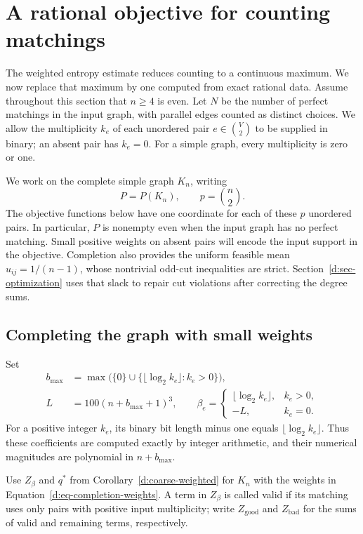 \section{A rational objective for counting matchings}
\label{d:sec-objective}

The weighted entropy estimate reduces counting to a continuous maximum.
We now replace that maximum by one computed from exact rational data.
Assume throughout this section that \(n\ge4\) is even.  Let \(N\) be the
number of perfect matchings in the input graph, with parallel edges
counted as distinct choices.  We allow the multiplicity \(k_e\) of each
unordered pair \(e\in\binom V2\) to be supplied in binary; an absent pair
has \(k_e=0\).  For a simple graph, every multiplicity is zero or one.

We work on the complete simple graph \(K_n\), writing
\[
  P=P(K_n),\qquad p=\binom n2.
\]
The objective functions below have one coordinate for each of these
\(p\) unordered pairs.  In particular, \(P\) is nonempty even when
the input graph has no perfect matching. Small positive weights on absent
pairs will encode the input support in the objective. Completion also
provides the uniform feasible mean \(u_{ij}=1/(n-1)\), whose nontrivial
odd-cut inequalities are strict. Section~\ref{d:sec-optimization} uses
that slack to repair cut violations after correcting the degree sums.

\subsection{Completing the graph with small weights}

Set
\begin{equation}
\label{d:eq-completion-weights}
\begin{split}
 b_{\max}&=\max\bigl(\{0\}\cup
       \{\lfloor\log_2 k_e\rfloor:k_e>0\}\bigr),\\
 L&=100(n+b_{\max}+1)^3,\qquad
 \beta_e=
 \begin{cases}
   \lfloor\log_2 k_e\rfloor,&k_e>0,\\
   -L,&k_e=0.
 \end{cases}
\end{split}
\end{equation}
For a positive integer \(k_e\), its binary bit length minus one equals
\(\lfloor\log_2 k_e\rfloor\).  Thus these coefficients are computed
exactly by integer arithmetic, and their numerical magnitudes are
polynomial in \(n+b_{\max}\).

Use \(Z_\beta\) and \(q^*\) from Corollary~\ref{d:coarse-weighted} for \(K_n\)
with the weights in Equation~\eqref{d:eq-completion-weights}.  A term in
\(Z_\beta\) is called valid if its matching uses only pairs with positive
input multiplicity; write \(Z_{\mathrm{good}}\) and
\(Z_{\mathrm{bad}}\) for the sums of valid and remaining terms,
respectively.


